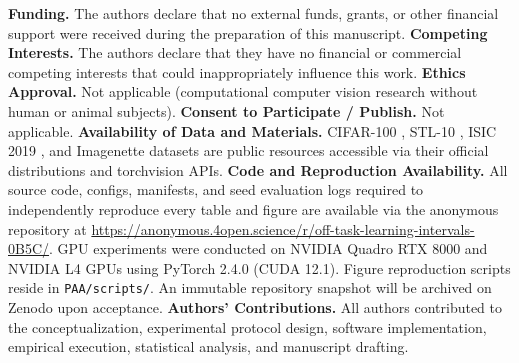 \documentclass[sn-mathphys,Numbered]{sn-jnl}
\begin{document}
\noindent\textbf{Funding.} The authors declare that no external funds, grants, or other financial support were received during the preparation of this manuscript.
\textbf{Competing Interests.} The authors declare that they have no financial or commercial competing interests that could inappropriately influence this work.
\textbf{Ethics Approval.} Not applicable (computational computer vision research without human or animal subjects).
\textbf{Consent to Participate / Publish.} Not applicable.
\textbf{Availability of Data and Materials.} CIFAR-100 \cite{krizhevsky2009cifar}, STL-10 \cite{coates2011stl10}, ISIC 2019 \cite{codella2018skin,tschandl2018ham10000}, and Imagenette \cite{howard2020fastai} datasets are public resources accessible via their official distributions and torchvision APIs.
\textbf{Code and Reproduction Availability.} All source code, configs, manifests, and seed evaluation logs required to independently reproduce every table and figure are available via the anonymous repository at \url{https://anonymous.4open.science/r/off-task-learning-intervals-0B5C/}. GPU experiments were conducted on NVIDIA Quadro RTX 8000 and NVIDIA L4 GPUs using PyTorch 2.4.0 (CUDA 12.1). Figure reproduction scripts reside in \texttt{PAA/scripts/}. An immutable repository snapshot will be archived on Zenodo upon acceptance.
\textbf{Authors' Contributions.} All authors contributed to the conceptualization, experimental protocol design, software implementation, empirical execution, statistical analysis, and manuscript drafting.

\renewcommand{\bibfont}{\normalfont\scriptsize}
\setlength{\bibsep}{0.0pt plus 0.1pt}

\end{document}
